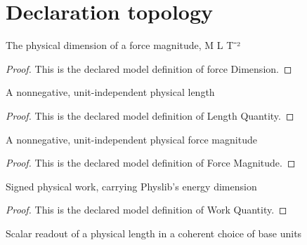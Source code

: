 \section{Declaration topology}
\begin{definition}
  \label{def:physics:phyx-mini-0809:phyxminiproblems-problemphyxmini0809-forcedimension}
  The physical dimension of a force magnitude, M L T⁻²
\end{definition}
\begin{proof}
  This is the declared model definition of force Dimension.
\end{proof}
\begin{definition}
  \label{def:physics:phyx-mini-0809:phyxminiproblems-problemphyxmini0809-lengthquantity}
  A nonnegative, unit-independent physical length
\end{definition}
\begin{proof}
  This is the declared model definition of Length Quantity.
\end{proof}
\begin{definition}
  \label{def:physics:phyx-mini-0809:phyxminiproblems-problemphyxmini0809-forcemagnitude}
  A nonnegative, unit-independent physical force magnitude
\end{definition}
\begin{proof}
  This is the declared model definition of Force Magnitude.
\end{proof}
\begin{definition}
  \label{def:physics:phyx-mini-0809:phyxminiproblems-problemphyxmini0809-workquantity}
  Signed physical work, carrying Physlib's energy dimension
\end{definition}
\begin{proof}
  This is the declared model definition of Work Quantity.
\end{proof}
\begin{definition}
  \label{def:physics:phyx-mini-0809:phyxminiproblems-problemphyxmini0809-lengthreadout}
  Scalar readout of a physical length in a coherent choice of base units
\end{definition}
